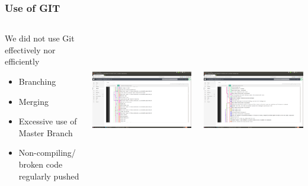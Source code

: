 \documentclass{beamer}
\begin{document}
\begin{frame}
\frametitle{Use of GIT}


\begin{columns}[T] %
     \begin{column}[T]{4cm} %
     We did not use Git effectively nor efficiently
		\begin{itemize}
			\item Branching
			\item Merging
			\item Excessive use of Master Branch
			\item Non-compiling/ broken code regularly pushed
		\end{itemize}
     \end{column}
     
     \begin{column}[T]{2.5cm} %
          \includegraphics[height=6cm,width=1\linewidth]{Images/Screen3.png}
     \end{column}
     
     \begin{column}[T]{2.5cm} %
          \includegraphics[height=6cm,width=1\linewidth]{Images/Screen4.png}
     \end{column}
     
\end{columns}
\end{frame}
\end{document}
